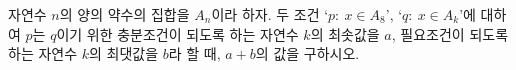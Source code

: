 자연수 $n$의 양의 약수의 집합을 $A_n$이라 하자. 두 조건 `$p:\ x\in A_8$', `$q:\ x\in A_k$'에 대하여 $p$는 $q$이기 위한 충분조건이 되도록 하는 자연수 $k$의 최솟값을 $a$, 필요조건이 되도록 하는 자연수 $k$의 최댓값을 $b$라 할 때, $a+b$의 값을 구하시오. 
